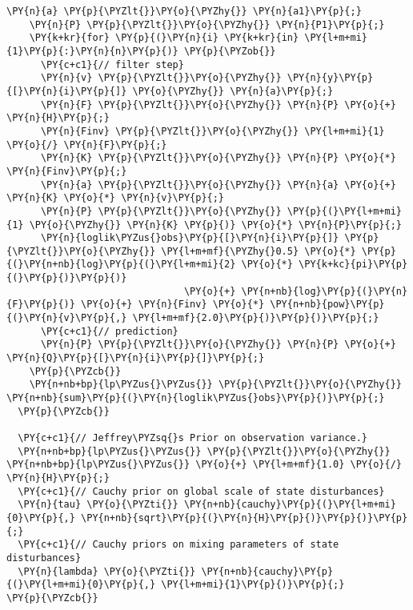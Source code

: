 \begin{Verbatim}[commandchars=\\\{\}]
    \PY{n}{a} \PY{p}{\PYZlt{}}\PY{o}{\PYZhy{}} \PY{n}{a1}\PY{p}{;}
    \PY{n}{P} \PY{p}{\PYZlt{}}\PY{o}{\PYZhy{}} \PY{n}{P1}\PY{p}{;}
    \PY{k+kr}{for} \PY{p}{(}\PY{n}{i} \PY{k+kr}{in} \PY{l+m+mi}{1}\PY{p}{:}\PY{n}{n}\PY{p}{)} \PY{p}{\PYZob{}}
      \PY{c+c1}{// filter step}
      \PY{n}{v} \PY{p}{\PYZlt{}}\PY{o}{\PYZhy{}} \PY{n}{y}\PY{p}{[}\PY{n}{i}\PY{p}{]} \PY{o}{\PYZhy{}} \PY{n}{a}\PY{p}{;}
      \PY{n}{F} \PY{p}{\PYZlt{}}\PY{o}{\PYZhy{}} \PY{n}{P} \PY{o}{+} \PY{n}{H}\PY{p}{;}
      \PY{n}{Finv} \PY{p}{\PYZlt{}}\PY{o}{\PYZhy{}} \PY{l+m+mi}{1} \PY{o}{/} \PY{n}{F}\PY{p}{;}
      \PY{n}{K} \PY{p}{\PYZlt{}}\PY{o}{\PYZhy{}} \PY{n}{P} \PY{o}{*} \PY{n}{Finv}\PY{p}{;}
      \PY{n}{a} \PY{p}{\PYZlt{}}\PY{o}{\PYZhy{}} \PY{n}{a} \PY{o}{+} \PY{n}{K} \PY{o}{*} \PY{n}{v}\PY{p}{;}
      \PY{n}{P} \PY{p}{\PYZlt{}}\PY{o}{\PYZhy{}} \PY{p}{(}\PY{l+m+mi}{1} \PY{o}{\PYZhy{}} \PY{n}{K} \PY{p}{)} \PY{o}{*} \PY{n}{P}\PY{p}{;}
      \PY{n}{loglik\PYZus{}obs}\PY{p}{[}\PY{n}{i}\PY{p}{]} \PY{p}{\PYZlt{}}\PY{o}{\PYZhy{}} \PY{l+m+mf}{\PYZhy{}0.5} \PY{o}{*} \PY{p}{(}\PY{n+nb}{log}\PY{p}{(}\PY{l+m+mi}{2} \PY{o}{*} \PY{k+kc}{pi}\PY{p}{(}\PY{p}{)}\PY{p}{)} 
                               \PY{o}{+} \PY{n+nb}{log}\PY{p}{(}\PY{n}{F}\PY{p}{)} \PY{o}{+} \PY{n}{Finv} \PY{o}{*} \PY{n+nb}{pow}\PY{p}{(}\PY{n}{v}\PY{p}{,} \PY{l+m+mf}{2.0}\PY{p}{)}\PY{p}{)}\PY{p}{;}
      \PY{c+c1}{// prediction}
      \PY{n}{P} \PY{p}{\PYZlt{}}\PY{o}{\PYZhy{}} \PY{n}{P} \PY{o}{+} \PY{n}{Q}\PY{p}{[}\PY{n}{i}\PY{p}{]}\PY{p}{;}
    \PY{p}{\PYZcb{}}
    \PY{n+nb+bp}{lp\PYZus{}\PYZus{}} \PY{p}{\PYZlt{}}\PY{o}{\PYZhy{}} \PY{n+nb}{sum}\PY{p}{(}\PY{n}{loglik\PYZus{}obs}\PY{p}{)}\PY{p}{;}
  \PY{p}{\PYZcb{}}

  \PY{c+c1}{// Jeffrey\PYZsq{}s Prior on observation variance.}
  \PY{n+nb+bp}{lp\PYZus{}\PYZus{}} \PY{p}{\PYZlt{}}\PY{o}{\PYZhy{}} \PY{n+nb+bp}{lp\PYZus{}\PYZus{}} \PY{o}{+} \PY{l+m+mf}{1.0} \PY{o}{/} \PY{n}{H}\PY{p}{;}
  \PY{c+c1}{// Cauchy prior on global scale of state disturbances}
  \PY{n}{tau} \PY{o}{\PYZti{}} \PY{n+nb}{cauchy}\PY{p}{(}\PY{l+m+mi}{0}\PY{p}{,} \PY{n+nb}{sqrt}\PY{p}{(}\PY{n}{H}\PY{p}{)}\PY{p}{)}\PY{p}{;}
  \PY{c+c1}{// Cauchy priors on mixing parameters of state disturbances}
  \PY{n}{lambda} \PY{o}{\PYZti{}} \PY{n+nb}{cauchy}\PY{p}{(}\PY{l+m+mi}{0}\PY{p}{,} \PY{l+m+mi}{1}\PY{p}{)}\PY{p}{;}
\PY{p}{\PYZcb{}}
\end{Verbatim}
